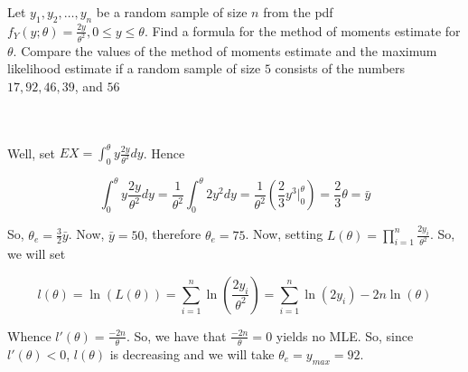 Let $y_1, y_2,\dots, y_n$ be a random sample of size $n$ from the pdf
$f_Y (y;\theta)=\frac{2y}{\theta^2}, 0\leq y\leq\theta$. Find a formula for the method of moments
estimate for $\theta$. Compare the values of the method of moments estimate and the maximum likelihood
estimate if a random sample of size $5$ consists of the numbers $17, 92, 46, 39$, and $56$\\\\

\begin{solution}\renewcommand{\qedsymbol}{}\ \\
    Well, set $EX=\int_0^{\theta}y\frac{2y}{\theta^2}dy$. Hence
    
    $$\int_0^{\theta}y\frac{2y}{\theta^2}dy=\frac{1}{\theta^2}\int_0^{\theta}2y^2dy
    =\frac{1}{\theta^2}(\frac23y^3|_0^\theta)=\frac23\theta=\bar{y}$$
    
    So, $\theta_e=\frac32\bar{y}$. Now, $\bar{y}=50$, therefore $\theta_e=75$. Now, setting
    $L(\theta)=\prod_{i=1}^n\frac{2y_i}{\theta^2}$. So, we will set

    $$l(\theta)=\ln(L(\theta))=\sum_{i=1}^n\ln(\frac{2y_i}{\theta^2})
    =\sum_{i=1}^n\ln(2y_i)-2n\ln(\theta)$$
    
    Whence $l'(\theta)=\frac{-2n}{\theta}$. So, we have that $\frac{-2n}{\theta}=0$ yields no MLE. So,
    since $l'(\theta)<0$, $l(\theta)$ is decreasing and we will take $\theta_e=y_{max}=92$.

\end{solution}